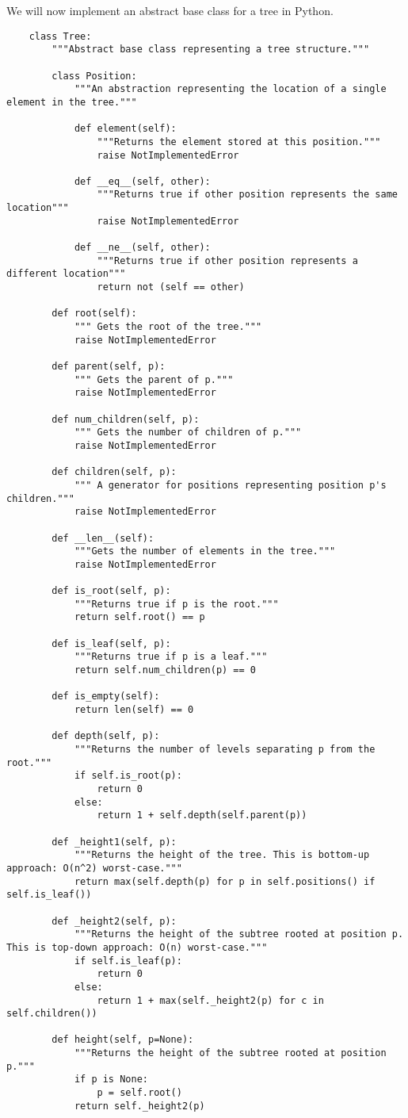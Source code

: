 \documentclass[]{article}
\begin{document}
We will now implement an abstract base class for a tree in Python.\\

\begin{lstlisting}
	class Tree:
		"""Abstract base class representing a tree structure."""
		
		class Position:
			"""An abstraction representing the location of a single element in the tree."""
			
			def element(self):
				"""Returns the element stored at this position."""
				raise NotImplementedError
				
			def __eq__(self, other):
				"""Returns true if other position represents the same location"""
				raise NotImplementedError
				
			def __ne__(self, other):
				"""Returns true if other position represents a different location"""
				return not (self == other)
			
		def root(self):
			""" Gets the root of the tree."""
			raise NotImplementedError
			
		def parent(self, p):
			""" Gets the parent of p."""
			raise NotImplementedError
			
		def num_children(self, p):
			""" Gets the number of children of p."""
			raise NotImplementedError
			
		def children(self, p):
			""" A generator for positions representing position p's children."""
			raise NotImplementedError
			
		def __len__(self):
			"""Gets the number of elements in the tree."""
			raise NotImplementedError
	 
	 	def is_root(self, p):
	 		"""Returns true if p is the root."""
	 		return self.root() == p
	 		
	 	def is_leaf(self, p):
	 		"""Returns true if p is a leaf."""
	 		return self.num_children(p) == 0
	 		
	 	def is_empty(self):
	 		return len(self) == 0
	 		
	 	def depth(self, p):
	 		"""Returns the number of levels separating p from the root."""
	 		if self.is_root(p):
	 			return 0
	 		else:
	 			return 1 + self.depth(self.parent(p))
	 			
	 	def _height1(self, p):
	 		"""Returns the height of the tree. This is bottom-up approach: O(n^2) worst-case."""
	 		return max(self.depth(p) for p in self.positions() if self.is_leaf())
	 		
	 	def _height2(self, p):
	 		"""Returns the height of the subtree rooted at position p. This is top-down approach: O(n) worst-case."""
	 		if self.is_leaf(p):
	 			return 0
	 		else:
	 			return 1 + max(self._height2(p) for c in self.children())
	 			
	 	def height(self, p=None):
	 		"""Returns the height of the subtree rooted at position p."""
	 		if p is None:
	 			p = self.root()
	 		return self._height2(p)
\end{lstlisting}\bigbreak
\end{document}
